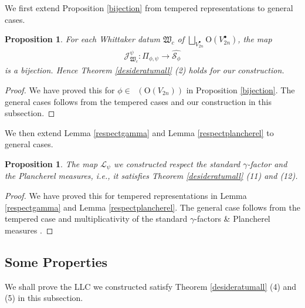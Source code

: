 \documentclass[article]{article}
\numberwithin{equation}{section}
\newtheorem{proposition}[theorem]{Proposition}
\theoremstyle{definition}
\DeclareMathOperator{\Para}{\Phi_{temp}}
\begin{document}
We first extend Proposition \ref{bijection} from tempered representations to general cases.  
\begin{proposition}\label{bijection2}
	For each Whittaker datum $\mathfrak W_{c}$ of $\bigsqcup_{V_{2n}^{\bullet}}\mathrm O(V_{2n}^\bullet)$, the map 
	\begin{align*}
	\mathcal J^{\psi}_{\mathfrak W_{c}}: \Pi_{\phi,\psi}\longrightarrow \widehat{\mathcal {S}_{\phi}}
	\end{align*} 
	is a bijection. Hence Theorem \ref{desideratumall} (2) holds for our construction.  
\end{proposition}
\begin{proof}
	We have proved this for $\phi\in \Para(\mathrm O(V_{2n}))$ in Proposition \ref{bijection}. The general cases follows from the tempered cases and our construction in this subsection.   
\end{proof}
 We then extend Lemma \ref{respectgamma} and Lemma \ref{respectplancherel} to general cases.  
\begin{proposition}\label{localfactor}
	The map $\mathcal L_{\psi}$ we constructed respect the standard $\gamma$-factor and the Plancherel measures, i.e., it satisfies Theorem \ref{desideratumall} (11) and (12).   
\end{proposition}
\begin{proof}
	We have proved this for tempered representations in Lemma \ref{respectgamma} and Lemma \ref{respectplancherel}. The general case follows from the tempered case and multiplicativity of the standard $\gamma$-factors \cite{MR2192828} \& Plancherel measures \cite[Section 10.2, Appendix B.5]{MR3166215}. 
\end{proof}



\subsection{Some Properties}
We shall prove the LLC we constructed satisfy Theorem \ref{desideratumall} (4) and (5) in this subsection. 
\end{document}
